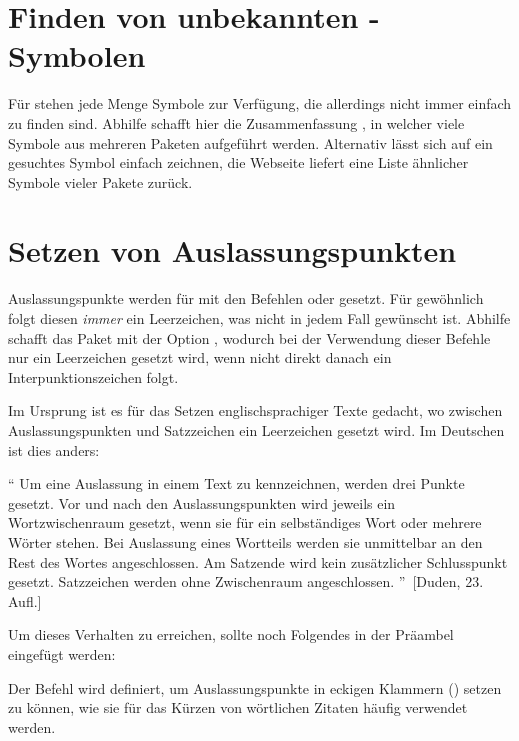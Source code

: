 \section{%
  Finden von unbekannten -Symbolen%
}
%
Für  stehen jede Menge Symbole zur Verfügung, die allerdings 
nicht immer einfach zu finden sind. Abhilfe schafft hier die Zusammenfassung 
, in 
welcher viele Symbole aus mehreren Paketen aufgeführt werden. Alternativ lässt 
sich auf  ein 
gesuchtes Symbol einfach zeichnen, die Webseite liefert eine Liste ähnlicher 
Symbole vieler Pakete zurück.



\section{%
  Setzen von Auslassungspunkten%
  \label{sec:tips:dots}%
}
%
%
Auslassungspunkte werden für  mit den Befehlen  oder 
 gesetzt. Für gewöhnlich folgt diesen \emph{immer} ein 
Leerzeichen, was nicht in jedem Fall gewünscht ist. Abhilfe schafft das Paket 
 mit der Option , wodurch bei der Verwendung 
dieser Befehle nur ein Leerzeichen gesetzt wird, wenn nicht direkt danach ein 
Interpunktionszeichen folgt.
%
\begin{quoting}
\begin{Code}
\usepackage[xspace]{ellipsis}
\end{Code}
\end{quoting}
%
Im Ursprung ist es für das Setzen englischsprachiger Texte gedacht, wo zwischen 
Auslassungspunkten und Satzzeichen ein Leerzeichen gesetzt wird. Im Deutschen 
ist dies anders:
%
\begin{quoting}
\enquote{%
  Um eine Auslassung in einem Text zu kennzeichnen, werden drei Punkte gesetzt. 
  Vor und nach den Auslassungspunkten wird jeweils ein Wortzwischenraum 
  gesetzt, wenn sie für ein selbständiges Wort oder mehrere Wörter stehen. Bei 
  Auslassung eines Wortteils werden sie unmittelbar an den Rest des Wortes 
  angeschlossen. Am Satzende wird kein zusätzlicher Schlusspunkt gesetzt. 
  Satzzeichen werden ohne Zwischenraum angeschlossen.%
}~[Duden, 23. Aufl.]
\end{quoting} 
%
Um dieses Verhalten zu erreichen, sollte noch Folgendes in der Präambel 
eingefügt werden:
%
\begin{quoting}
\begin{Code}
\let\ellipsispunctuation\relax
\newcommand*{\qdots}{[\dots{}]\xspace}
\end{Code}
\end{quoting}
%
Der Befehl  wird definiert, um Auslassungspunkte in eckigen 
Klammern (\OPValue{\dots}) setzen zu können, wie sie für das Kürzen von 
wörtlichen Zitaten häufig verwendet werden.



